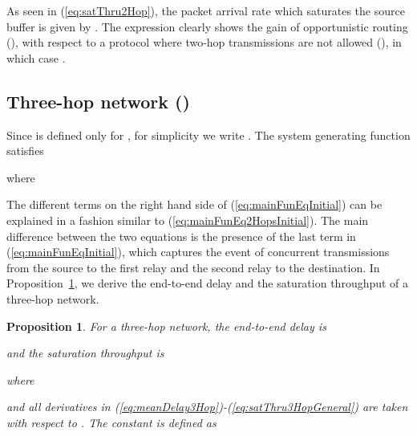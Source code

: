 \documentclass[draftclsnofoot,10pt,onecolumn,letterpaper]{IEEEtran}
\newtheorem{propos}{Proposition}
\begin{document}
As seen in (\ref{eq:satThru2Hop}), the packet arrival rate which saturates the source buffer 
is given by . The expression clearly shows the gain of 
opportunistic routing (), with respect to a protocol where two-hop transmissions are not allowed (), in which case .

\subsection{Three-hop network ()}

Since  is defined only for , for simplicity we write . The system generating function satisfies

where

The different terms on the right hand side of (\ref{eq:mainFunEqInitial}) can be explained in a fashion similar to (\ref{eq:mainFunEq2HopsInitial}). 
The main difference between the two equations is the presence of the last term in (\ref{eq:mainFunEqInitial}), which captures the event of concurrent transmissions from the source to the first relay
and the second relay to the destination. In Proposition~\ref{prop:thru3Hop}, we derive the end-to-end delay and the saturation throughput of a three-hop network.
\begin{propos}
 \label{prop:thru3Hop}
For a three-hop network, the end-to-end delay is

and the saturation throughput is 

where 




and all derivatives in (\ref{eq:meanDelay3Hop})-(\ref{eq:satThru3HopGeneral}) are taken with respect to . The constant  is defined as

\end{propos}
\end{document}
